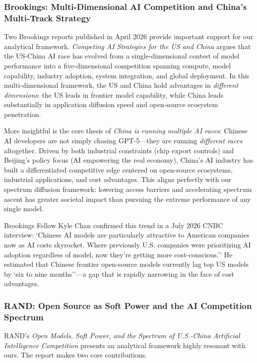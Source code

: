 \subsubsection{Brookings: Multi-Dimensional AI Competition and China's Multi-Track Strategy}

Two Brookings reports published in April 2026 provide important support for our analytical framework. \textit{Competing AI Strategies for the US and China} argues that the US-China AI race has evolved from a single-dimensional contest of model performance into a five-dimensional competition spanning compute, model capability, industry adoption, system integration, and global deployment. In this multi-dimensional framework, the US and China hold advantages in \textit{different dimensions}: the US leads in frontier model capability, while China leads substantially in application diffusion speed and open-source ecosystem penetration.

More insightful is the core thesis of \textit{China is running multiple AI races}: Chinese AI developers are not simply chasing GPT-5---they are running \textit{different races} altogether. Driven by both industrial constraints (chip export controls) and Beijing's policy focus (AI empowering the real economy), China's AI industry has built a differentiated competitive edge centered on open-source ecosystems, industrial applications, and cost advantages. This aligns perfectly with our spectrum diffusion framework: lowering access barriers and accelerating spectrum ascent has greater societal impact than pursuing the extreme performance of any single model.

Brookings Fellow Kyle Chan confirmed this trend in a July 2026 CNBC interview: `Chinese AI models are particularly attractive to American companies now as AI costs skyrocket. Where previously U.S. companies were prioritizing AI adoption regardless of model, now they're getting more cost-conscious.'' He estimated that Chinese frontier open-source models currently lag top US models by `six to nine months''---a gap that is rapidly narrowing in the face of cost advantages.

\subsubsection{RAND: Open Source as Soft Power and the AI Competition Spectrum}

RAND's \textit{Open Models, Soft Power, and the Spectrum of U.S.-China Artificial Intelligence Competition} presents an analytical framework highly resonant with ours. The report makes two core contributions.

